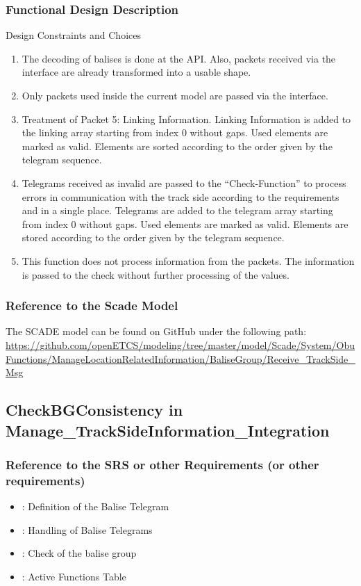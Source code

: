\subsubsection{Functional Design Description}
Design Constraints and Choices
\begin{enumerate}
\item The decoding of balises is done at the API. Also, packets received via the interface are already transformed into a usable shape.
\item Only packets used inside the current model are passed via the interface.
\item Treatment of Packet 5: Linking Information.
Linking Information is added to the linking array starting from index 0 without gaps. Used elements are marked as valid. Elements are sorted according to the order given by the telegram sequence.
\item Telegrams received as invalid are passed to the ``Check-Function'' to process errors in communication with the track side according to the requirements and in a single place.
Telegrams are added to the telegram array starting from index 0 without gaps. Used elements are marked as valid. Elements are stored according to the order given by the telegram sequence.
\item This function does not process information from the packets. The information is passed to the check without further processing of the values. 
\end{enumerate}

\subsubsection{Reference to the Scade Model}
The SCADE model can be found on GitHub under the following path:
\url{https://github.com/openETCS/modeling/tree/master/model/Scade/System/ObuFunctions/ManageLocationRelatedInformation/BaliseGroup/Receive_TrackSide_Msg}


\subsection{CheckBGConsistency in Manage\_TrackSideInformation\_Integration}
\subsubsection{Reference to the SRS or other Requirements (or other requirements)}
\begin{itemize}
  \item \cite[Chapt.~7 and 8]{subset-026}: Definition of the Balise Telegram
  \item \cite[Chapt.~3.4.1 - 3.4.3, 3.16.2]{subset-026}: Handling of Balise Telegrams
  \item \cite[Chapt.~3.16.2]{subset-026}: Check of the balise group
  \item \cite[Chapt.~4.5.2]{subset-026}: Active Functions Table
\end{itemize}

